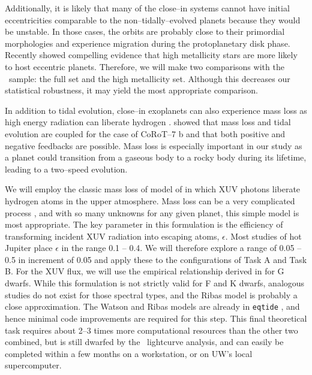 Additionally, it is likely that many of the close--in systems cannot
have initial eccentricities comparable to the non--tidally--evolved
planets because they would be unstable.  In those cases, the orbits
are probably close to their primordial morphologies and experience
migration during the protoplanetary disk phase.  Recently
\cite{DawsonMurrayClay13} showed compelling evidence that high
metallicity stars are more likely to host eccentric planets.
Therefore, we will make two comparisons with the \kepler~sample: the
full set and the high metallicity set.  Although this decreases our
statistical robustness, it may yield the most appropriate comparison.

\medskip
{\centerline{}}
\smallskip

In addition to tidal evolution, close--in exoplanets can also
experience mass loss as high energy radiation can liberate hydrogen
\citep{Watson81,VidalMadjar04}.  \cite{Jackson10} showed that mass
loss and tidal evolution are coupled for the case of CoRoT--7 b and
that both positive and negative feedbacks are possible.  Mass loss is
especially important in our study as a planet could transition from a
gaseous body to a rocky body during its lifetime, leading to a
two--speed evolution.

We will employ the classic mass loss of model of \cite{Watson81} in
which XUV photons liberate hydrogen atoms in the upper atmosphere.
Mass loss can be a very complicated process
\citep{Yelle04,Lammer07,Khodachenko07,Leitzinger11,Lammer13}, and with
so many unknowns for any given planet, this simple model is most
appropriate.  The key parameter in this formulation is the efficiency
of transforming incident XUV radiation into escaping atoms,
$\epsilon$.  Most studies of hot Jupiter place $\epsilon$ in the range
0.1 -- 0.4.  We will therefore explore a range of 0.05 -- 0.5 in
increment of 0.05 and apply these to the configurations of Task A and
Task B.  For the XUV flux, we will use the empirical relationship
derived in \cite{Ribas05} for G dwarfs.  While this formulation is not
strictly valid for F and K dwarfs, analogous studies do not exist for
those spectral types, and the Ribas model is probably a close
approximation.  The Watson and Ribas models are already in
\texttt{eqtide} \citep{Barnes13}, and hence minimal code improvements
are required for this step.  This final theoretical task requires
about 2--3 times more computational resources than the other two
combined, but is still dwarfed by the \kepler~lightcurve analysis, and
can easily be completed within a few months on a workstation, or on
UW's local supercomputer.

